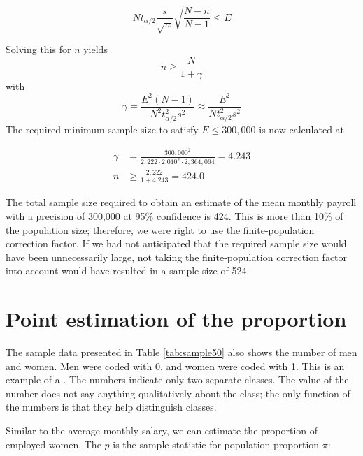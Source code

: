 \begin{equation*}
  N t_{\alpha/2} \frac{s}{\sqrt{n}} \sqrt{\frac{N - n}{N-1}} \leq E
\end{equation*}

Solving this for $n$ yields
\begin{equation}
  n \geq \frac{N}{1 + \gamma}
\end{equation}
with
\begin{equation}
  \gamma = \frac{E^2 (N-1)}{N^2 t_{\alpha/2}^2 s^2} \approx \frac{E^2}{N t_{\alpha/2}^2 s^2}
\end{equation}
The required minimum sample size to satisfy $E \leq 300,000$ is now calculated at

\begin{align*} 
\gamma &= \frac{300,000^2}{2,222 \cdot 2.010^2 \cdot 2,364,064} = 4.243 \\ 
n &\geq \frac{2,222}{1 + 4.243} = 424.0
\end{align*}

The total sample size required to obtain an estimate of the mean monthly payroll with a precision of 300,000 at 95\% confidence is 424. This is more than 10\% of the population size; therefore, we were right to use the finite-population correction factor. If we had not anticipated that the required sample size would have been unnecessarily large, not taking the finite-population correction factor into account would have resulted in a sample size of 524.


\section{Point estimation of the proportion} %
\label{sec:point_estimation_of_the_proportion}


The sample data presented in Table \ref{tab:sample50} also shows the number of men and women. Men were coded with 0, and women were coded with 1. This is an example of a . The numbers indicate only two separate classes. The value of the number does not say anything qualitatively about the class; the only function of the numbers is that they help distinguish classes.

Similar to the average monthly salary, we can estimate the proportion of employed women. The  $p$ is the sample statistic for population proportion $\pi$:

